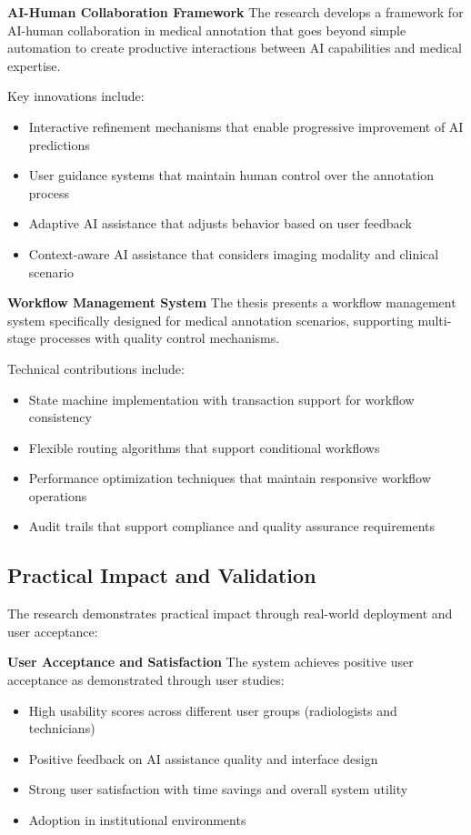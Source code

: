 \textbf{AI-Human Collaboration Framework}
The research develops a framework for AI-human collaboration in medical annotation that goes beyond simple automation to create productive interactions between AI capabilities and medical expertise.

Key innovations include:
\begin{itemize}
    \item Interactive refinement mechanisms that enable progressive improvement of AI predictions
    \item User guidance systems that maintain human control over the annotation process
    \item Adaptive AI assistance that adjusts behavior based on user feedback
    \item Context-aware AI assistance that considers imaging modality and clinical scenario
\end{itemize}

\textbf{Workflow Management System}
The thesis presents a workflow management system specifically designed for medical annotation scenarios, supporting multi-stage processes with quality control mechanisms.

Technical contributions include:
\begin{itemize}
    \item State machine implementation with transaction support for workflow consistency
    \item Flexible routing algorithms that support conditional workflows
    \item Performance optimization techniques that maintain responsive workflow operations
    \item Audit trails that support compliance and quality assurance requirements
\end{itemize}

\subsection{Practical Impact and Validation}

The research demonstrates practical impact through real-world deployment and user acceptance:

\textbf{User Acceptance and Satisfaction}
The system achieves positive user acceptance as demonstrated through user studies:
\begin{itemize}
    \item High usability scores across different user groups (radiologists and technicians)
    \item Positive feedback on AI assistance quality and interface design
    \item Strong user satisfaction with time savings and overall system utility
    \item Adoption in institutional environments
\end{itemize}

